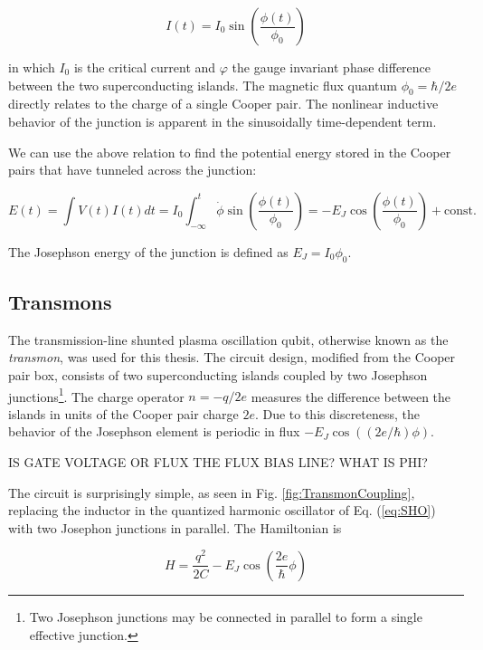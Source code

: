 \documentclass[11 pt, oneside]{book} %
\begin{document}
\begin{equation}
I(t)=I_0\sin\left(\frac{\phi(t)}{\phi_0}\right)
\end{equation}

in which $I_0$ is the critical current and $\varphi$ the gauge invariant phase difference between the two superconducting islands. The magnetic flux quantum $\phi_0=\hbar/2e$ directly relates to the charge of a single Cooper pair. The nonlinear inductive behavior of the junction is apparent in the sinusoidally time-dependent term. 

We can use the above relation to find the potential energy stored in the Cooper pairs that have tunneled across the junction:

\begin{equation}
E(t)=\int V(t)I(t)dt = I_0\int_{-\infty}^{t}    \dot{\phi}\sin\left(\frac{\phi(t)}{\phi_0}\right)=
-E_J\cos\left(\frac{\phi(t)}{\phi_0}\right)+\mathrm{const}.
\end{equation}

The Josephson energy of the junction is defined as $E_J=I_0\phi_0$.


\subsection{Transmons}\label{sec:Transmons}
The transmission-line shunted plasma oscillation qubit\cite{Koch}, otherwise known as the \emph{transmon}, was used for this thesis. The circuit design, modified from the Cooper pair box\cite{Bouchiat, Nakamura}, consists of two superconducting islands coupled by two Josephson junctions\footnote{Two Josephson junctions may be connected in parallel to form a single effective junction.}. The charge operator $n=-q/2e$ measures the difference between the islands in units of the Cooper pair charge $2e$. Due to this discreteness, the behavior of the Josephson element is periodic in flux $-E_J\cos((2e/\hbar)\phi)$. 

IS GATE VOLTAGE OR FLUX THE FLUX BIAS LINE? WHAT IS PHI?

The circuit is surprisingly simple, as seen in Fig. \ref{fig:TransmonCoupling}, replacing the inductor in the quantized harmonic oscillator of Eq. (\ref{eq:SHO}) with two Josephon junctions in parallel. The Hamiltonian is

\begin{equation}
H=\frac{q^2}{2C}-E_J\cos\left(   \frac{2e}{\hbar}\phi     \right)
\end{equation}
\end{document}
